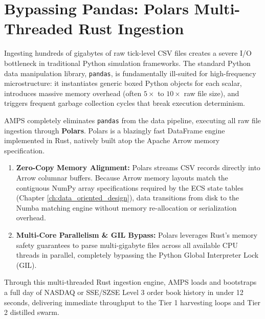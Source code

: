\section{Bypassing Pandas: Polars Multi-Threaded Rust Ingestion}

Ingesting hundreds of gigabytes of raw tick-level CSV files creates a severe I/O bottleneck in traditional Python simulation frameworks. The standard Python data manipulation library, \texttt{pandas}, is fundamentally ill-suited for high-frequency microstructure: it instantiates generic boxed Python objects for each scalar, introduces massive memory overhead (often $5\times$ to $10\times$ raw file size), and triggers frequent garbage collection cycles that break execution determinism.

AMPS completely eliminates \texttt{pandas} from the data pipeline, executing all raw file ingestion through \textbf{Polars}. Polars is a blazingly fast DataFrame engine implemented in Rust, natively built atop the Apache Arrow memory specification.

\begin{enumerate}
    \item \textbf{Zero-Copy Memory Alignment:} Polars streams CSV records directly into Arrow columnar buffers. Because Arrow memory layouts match the contiguous NumPy array specifications required by the ECS state tables (Chapter \ref{ch:data_oriented_design}), data transitions from disk to the Numba matching engine without memory re-allocation or serialization overhead.
    \item \textbf{Multi-Core Parallelism \& GIL Bypass:} Polars leverages Rust's memory safety guarantees to parse multi-gigabyte files across all available CPU threads in parallel, completely bypassing the Python Global Interpreter Lock (GIL).
\end{enumerate}

Through this multi-threaded Rust ingestion engine, AMPS loads and bootstraps a full day of NASDAQ or SSE/SZSE Level 3 order book history in under 12 seconds, delivering immediate throughput to the Tier 1 harvesting loops and Tier 2 distilled swarm.
